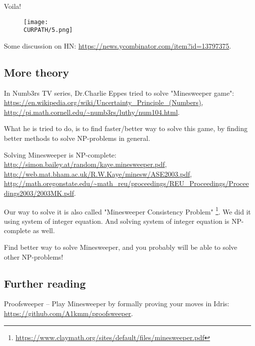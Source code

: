 Voila!

\begin{figure}[H]
\centering
\texttt{[image: \\CURPATH/5.png]}
\end{figure}

Some discussion on HN: \url{https://news.ycombinator.com/item?id=13797375}.

\subsection{More theory}

In Numb3rs TV series, Dr.Charlie Eppes tried to solve "Minesweeper game":
\url{https://en.wikipedia.org/wiki/Uncertainty_Principle_(Numbers)},
\url{http://pi.math.cornell.edu/~numb3rs/luthy/num104.html}.

What he is tried to do, is to find faster/better way to solve this game, by finding better methods to solve NP-problems in general.

Solving Minesweeper is NP-complete:
\url{http://simon.bailey.at/random/kaye.minesweeper.pdf},
\url{http://web.mat.bham.ac.uk/R.W.Kaye/minesw/ASE2003.pdf},
\url{http://math.oregonstate.edu/~math_reu/proceedings/REU_Proceedings/Proceedings2003/2003MK.pdf}.

Our way to solve it is also called "Minesweeper Consistency Problem"
\footnote{\url{https://www.claymath.org/sites/default/files/minesweeper.pdf}}.
We did it using system of integer equation.
And solving system of integer equation is NP-complete as well.

Find better way to solve Minesweeper, and you probably will be able to solve other NP-problems!

\subsection{Further reading}

Proofsweeper -- Play Minesweeper by formally proving your moves in Idris: \url{https://github.com/A1kmm/proofsweeper}.


